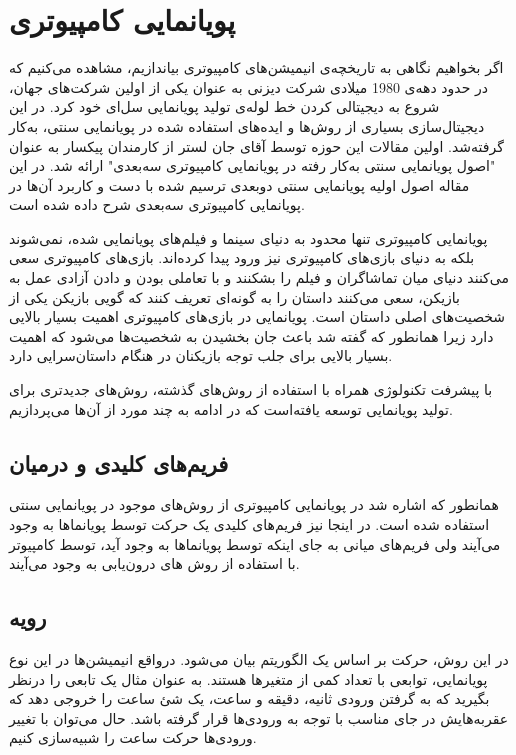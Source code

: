 \section{پویانمایی کامپیوتری}

اگر بخواهیم نگاهی به تاریخچه‌ی انیمیشن‌های کامپیوتری بیاندازیم، مشاهده می‌کنیم که 
در حدود دهه‌ی 1980 میلادی شرکت دیزنی به عنوان یکی از اولین شرکت‌های جهان، شروع به 
دیجیتالی کردن خط لوله‌ی تولید پویانمایی سل‌ای خود کرد.
در این دیجیتال‌سازی بسیاری از روش‌ها و ایده‌‌های استفاده شده در پویانمایی سنتی،
به‌کار گرفته‌شد.
اولین مقالات این حوزه توسط آقای جان لستر از کارمندان پیکسار به عنوان 
"اصول پویانمایی سنتی به‌کار رفته در پویانمایی کامپیوتری سه‌بعدی"
ارائه شد.
در این مقاله اصول اولیه پویانمایی سنتی دوبعدی ترسیم شده با دست
و کاربرد آن‌ها در پویانمایی کامپیوتری سه‌بعدی شرح داده شده است.

پویانمایی کامپیوتری تنها محدود به دنیای سینما و فیلم‌های پویانمایی شده، نمی‌شوند بلکه به دنیای
بازی‌های کامپیوتری نیز ورود پیدا کرده‌اند. بازی‌های کامپیوتری سعی می‌کنند دنیای میان تماشاگران و فیلم را بشکنند و 
با تعاملی بودن و دادن آزادی عمل به بازیکن، سعی می‌کنند داستان را به گونه‌ای تعریف کنند که گویی بازیکن یکی از شخصیت‌های اصلی داستان است.
پویانمایی در بازی‌های کامپیوتری اهمیت بسیار بالایی دارد زیرا همانطور که گفته شد باعث 
جان بخشیدن به شخصیت‌ها می‌شود که اهمیت بسیار بالایی برای جلب توجه بازیکنان در هنگام داستان‌سرایی دارد.

با پیشرفت تکنولوژی همراه با استفاده از روش‌های گذشته، روش‌های جدیدتری برای تولید پویانمایی توسعه یافته‌است که 
در ادامه به چند مورد از آن‌‌ها می‌پردازیم.

\subsection{فریم‌های کلیدی و درمیان}

همانطور که اشاره شد در پویانمایی کامپیوتری از روش‌های موجود در 
پویانمایی سنتی استفاده شده است. در اینجا نیز فریم‌های کلیدی 
یک حرکت توسط پویانماها به وجود می‌‌آیند ولی فریم‌های میانی به جای اینکه توسط پویانماها به وجود آید،
توسط کامپیوتر با استفاده از روش های درون‌یابی به وجود می‌آیند.

\subsection{رویه}

در این روش، حرکت بر اساس یک الگوریتم بیان می‌شود.
درواقع انیمیشن‌ها در این نوع پویانمایی، توابعی با تعداد کمی از متغیر‌ها هستند.
به عنوان مثال یک تابعی را درنظر بگیرید که به گرفتن ورودی ثانیه، دقیقه و ساعت، 
یک شئ ساعت را خروجی دهد که عقربه‌هایش در جای مناسب با توجه به ورودی‌ها قرار گرفته باشد.
حال می‌توان با تغییر ورودی‌ها حرکت ساعت را شبیه‌سازی کنیم.

